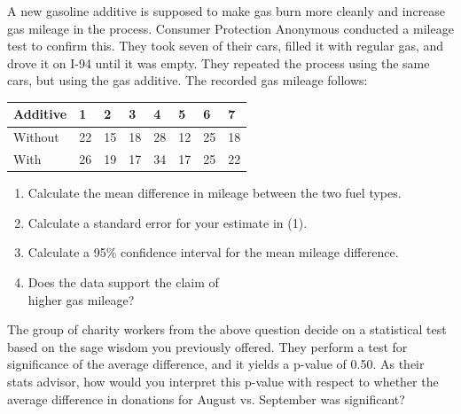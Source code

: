 \documentclass[11pt, chapterprefix=true]{scrbook}\usepackage[]{graphicx}\usepackage[]{color}
\begin{document}
\begin{exercises}
\begin{solution}
\end{solution}

\begin{exercise}  %

A new gasoline additive is supposed to make gas burn more cleanly and increase gas mileage in the process.  Consumer Protection Anonymous conducted a mileage test to confirm this.  They took seven of their cars, filled it with regular gas, and drove it on I-94 until it was empty.  They repeated the process using the same cars, but using the gas additive.  The recorded gas mileage follows:

\begin{tabular}{@{} llllllll @{}} \hline
Additive & 1 & 2 & 3 & 4 & 5 & 6 & 7 \\ \hline
Without & 22 & 15 & 18 & 28 & 12 & 25 & 18 \\
With    & 26 & 19 & 17 & 34 & 17 & 25 & 22 \\ \hline
\end{tabular}

\begin{enumerate}
  \item Calculate the mean difference in mileage between the two fuel types.         \item Calculate a standard error for your estimate in (1).
  \item Calculate a 95\% confidence interval for the mean mileage difference.
  \item Does the data support the claim of \\ higher gas mileage?
\end{enumerate}

\end{exercise}
\begin{solution}  %

\end{solution}

\begin{exercise}  %

The group of charity workers from the above question decide on a statistical test based on the sage wisdom you previously offered. They perform a test for significance of the average difference, and it yields a p-value of 0.50. As their stats advisor, how would you interpret this p-value with respect to whether the average difference in donations for August vs. September was significant?
\end{exercise}
\begin{solution}  %

\end{solution}

\end{exercises}
\end{document}
